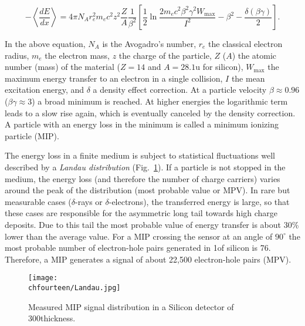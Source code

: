 \begin{equation}
- \left\langle\frac{dE}{dx}\right\rangle = 4\pi N_Ar_e^2m_ec^2 z^2\frac{Z}{A}\frac{1}{\beta^2}\left[ \frac{1}{2}\ln\frac{2m_ec^2\beta^2\gamma^2W_\mathrm{max}}{I^2} - \beta^2 - \frac{\delta(\beta\gamma)}{2}\right].
\end{equation}

In the above equation, $N_A$ is the Avogadro's number, 
$r_e$ the classical electron radius,
$m_e$ the electron mass,
$z$ the charge of the particle,
$Z$ ($A$) the atomic number (mass) of the material ($Z = 14$ and $A = 28.1$\unit{u} for silicon),
$W_\mathrm{max}$ the maximum energy transfer to an electron in a single collision,
$I$ the mean excitation energy,
and $\delta$ a density effect correction.
At a particle velocity $\beta \approx 0.96$ ($\beta\gamma \approx 3$) a broad minimum is reached. At higher energies the logarithmic term leads to a slow rise again, which is eventually canceled by the density correction. A particle with an energy loss in the minimum is called a minimum ionizing particle (MIP).

The energy loss in a finite medium is subject to statistical fluctuations well described by a \textit{Landau distribution} (Fig.~\ref{fig:Landau}).
If a particle is not stopped in the medium, the energy loss (and therefore the number of charge carriers) varies around the peak of the distribution (most probable value or MPV).
In rare but measurable cases ($\delta$-rays or $\delta$-electrons), the transferred energy is large, so that these cases are responsible for the asymmetric long tail towards high charge deposits.
Due to this tail the most probable value of energy transfer is about 30\% lower than the average value.
For a MIP crossing the sensor at an angle of $90^\circ$ the most probable number of electron-hole pairs generated in 1\mum of silicon is 76.
Therefore, a MIP generates a signal of about 22,500 electron-hole pairs (MPV).\\

\begin{figure}[!htb]
 \begin{center}
 \texttt{[image: \\chfourteen/Landau.jpg]}
 \end{center}
 \caption{Measured MIP signal distribution in a Silicon detector of 300\mum thickness.}
 \label{fig:Landau}
\end{figure}

